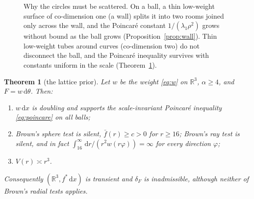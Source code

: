 \documentclass[11pt]{amsart}
\newcommand{\R}{\mathbb{R}}
\newcommand{\dd}{\,\mathrm{d}}
\newcommand{\fbar}{\bar f}
\theoremstyle{plain}
\newtheorem{theorem}{Theorem}[section]
\theoremstyle{definition}
\theoremstyle{remark}
\begin{document}
\begin{figure}[t]
\centering
{}
\caption{Why the circles must be scattered. On a ball, a thin low-weight surface
of co-dimension one (a wall) splits it into two rooms joined only across the
wall, and the Poincar\'e constant $1/(\lambda_1\rho^2)$ grows without bound as
the ball grows (Proposition~\ref{prop:wall}). Thin low-weight tubes around
curves (co-dimension two) do not disconnect the ball, and the Poincar\'e
inequality survives with constants uniform in the scale (Theorem~\ref{thm:B}).}
\label{fig:wallcircle}
\end{figure}

\begin{theorem}[the lattice prior]\label{thm:B}
Let $w$ be the weight \eqref{eq:w} on $\R^3$, $\alpha\ge4$, and $F=w\dd\theta$.
Then:
\begin{enumerate}[label=\textup{(\alph*)},leftmargin=2em,itemsep=2pt]
\item $w\dd x$ is doubling and supports the scale-invariant Poincar\'e
inequality \eqref{eq:poincare} on all balls;
\item Brown's sphere test is silent, $\fbar(r)\ge c>0$ for $r\ge16$; Brown's
ray test is silent, and in fact
$\int_{16}^\infty\dd r/(r^2w(r\varphi))=\infty$ for \emph{every} direction
$\varphi$;
\item $V(r)\asymp r^3$.
\end{enumerate}
Consequently $(\R^3,f^*\dd x)$ is transient and $\delta_F$ is inadmissible,
although neither of Brown's radial tests applies.
\end{theorem}
\end{document}
